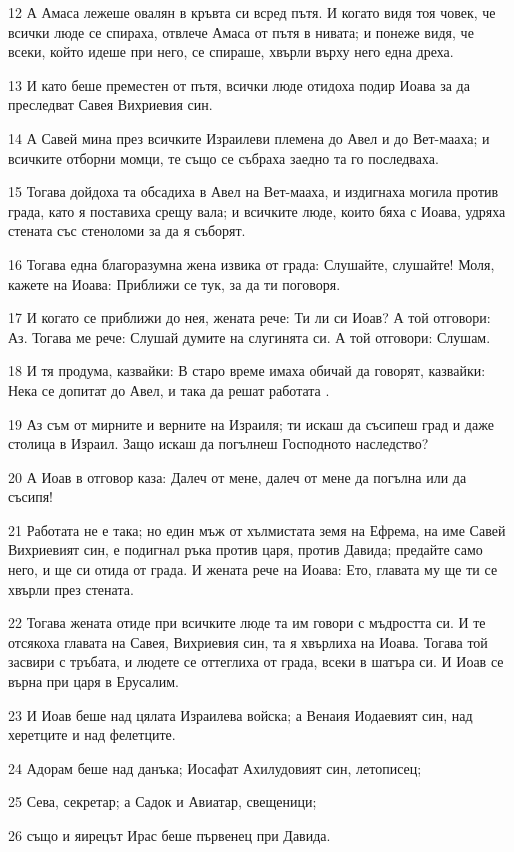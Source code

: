 \par 12 А Амаса лежеше овалян в кръвта си всред пътя. И когато видя тоя човек, че всички люде се спираха, отвлече Амаса от пътя в нивата; и понеже видя, че всеки, който идеше при него, се спираше, хвърли върху него една дреха.
\par 13 И като беше преместен от пътя, всички люде отидоха подир Иоава за да преследват Савея Вихриевия син.
\par 14 А Савей мина през всичките Израилеви племена до Авел и до Вет-мааха; и всичките отборни момци, те също се събраха заедно та го последваха.
\par 15 Тогава дойдоха та обсадиха в Авел на Вет-мааха, и издигнаха могила против града, като я поставиха срещу вала; и всичките люде, които бяха с Иоава, удряха стената със стеноломи за да я съборят.
\par 16 Тогава една благоразумна жена извика от града: Слушайте, слушайте! Моля, кажете на Иоава: Приближи се тук, за да ти поговоря.
\par 17 И когато се приближи до нея, жената рече: Ти ли си Иоав? А той отговори: Аз. Тогава ме рече: Слушай думите на слугинята си. А той отговори: Слушам.
\par 18 И тя продума, казвайки: В старо време имаха обичай да говорят, казвайки: Нека се допитат до Авел, и така да решат работата .
\par 19 Аз съм от мирните и верните на Израиля; ти искаш да съсипеш град и даже столица в Израил. Защо искаш да погълнеш Господното наследство?
\par 20 А Иоав в отговор каза: Далеч от мене, далеч от мене да погълна или да съсипя!
\par 21 Работата не е така; но един мъж от хълмистата земя на Ефрема, на име Савей Вихриевият син, е подигнал ръка против царя, против Давида; предайте само него, и ще си отида от града. И жената рече на Иоава: Ето, главата му ще ти се хвърли през стената.
\par 22 Тогава жената отиде при всичките люде та им говори с мъдростта си. И те отсякоха главата на Савея, Вихриевия син, та я хвърлиха на Иоава. Тогава той засвири с тръбата, и людете се оттеглиха от града, всеки в шатъра си. И Иоав се върна при царя в Ерусалим.
\par 23 И Иоав беше над цялата Израилева войска; а Венаия Иодаевият син, над херетците и над фелетците.
\par 24 Адорам беше над данъка; Иосафат Ахилудовият син, летописец;
\par 25 Сева, секретар; а Садок и Авиатар, свещеници;
\par 26 също и яирецът Ирас беше първенец при Давида.

